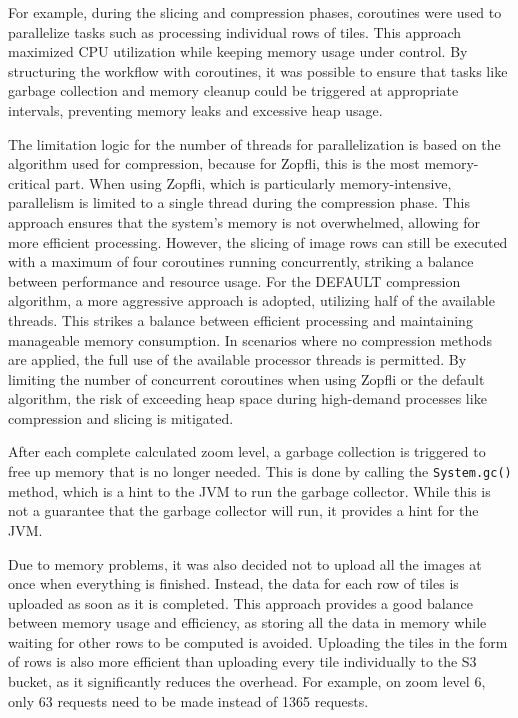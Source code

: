For example, during the slicing and compression phases, coroutines were used to parallelize tasks such as processing individual rows of tiles. This approach maximized CPU utilization while keeping memory usage under control. By structuring the workflow with coroutines, it was possible to ensure that tasks like garbage collection and memory cleanup could be triggered at appropriate intervals, preventing memory leaks and excessive heap usage.

The limitation logic for the number of threads for parallelization is based on the algorithm used for compression, because for Zopfli, this is the most memory-critical part. When using Zopfli, which is particularly memory-intensive, parallelism is limited to a single thread during the compression phase. This approach ensures that the system's memory is not overwhelmed, allowing for more efficient processing. However, the slicing of image rows can still be executed with a maximum of four coroutines running concurrently, striking a balance between performance and resource usage. For the DEFAULT compression algorithm, a more aggressive approach is adopted, utilizing half of the available threads. This strikes a balance between efficient processing and maintaining manageable memory consumption. In scenarios where no compression methods are applied, the full use of the available processor threads is permitted. By limiting the number of concurrent coroutines when using Zopfli or the default algorithm, the risk of exceeding heap space during high-demand processes like compression and slicing is mitigated.

After each complete calculated zoom level, a garbage collection is triggered to free up memory that is no longer needed. This is done by calling the \texttt{System.gc()} method, which is a hint to the JVM to run the garbage collector. While this is not a guarantee that the garbage collector will run, it provides a hint for the JVM.

Due to memory problems, it was also decided not to upload all the images at once when everything is finished. Instead, the data for each row of tiles is uploaded as soon as it is completed. This approach provides a good balance between memory usage and efficiency, as storing all the data in memory while waiting for other rows to be computed is avoided. Uploading the tiles in the form of rows is also more efficient than uploading every tile individually to the S3 bucket, as it significantly reduces the overhead. For example, on zoom level 6, only 63 requests need to be made instead of 1365 requests.